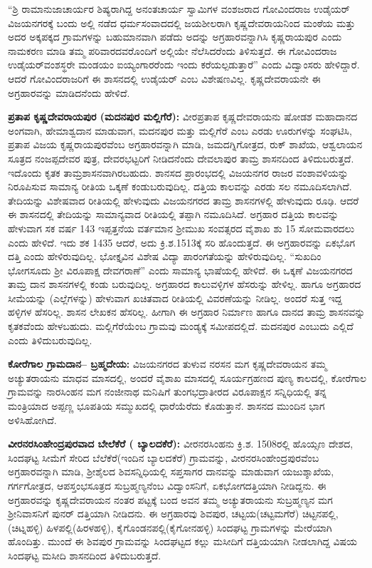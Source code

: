 “ಶ್ರಿ ರಾಮಾನುಜಾಚಾರ್ಯರ ಶಿಷ್ಯರಾಗಿದ್ದ ಅನಂತಚಾರ್ಯ ಸ್ವಾಮಿಗಳ ವಂಶಜರಾದ ಗೋವಿಂದರಾಜ ಉಡೈಯರ್​ ವಿಜಯನಗರಕ್ಕೆ ಬಂದು ಅಲ್ಲಿ ನಡೆದ ಧರ್ಮಸಂವಾದದಲ್ಲಿ ಜಯಶೀಲರಾಗಿ ಕೃಷ್ಣದೇವರಾಯನಿಂದ ಮಂಠೆಯ ಮತ್ತು ಅದರ ಅಕ್ಕಪಕ್ಕದ ಗ್ರಾಮಗಳನ್ನು ಬಹುಮಾನವಾಗಿ ಪಡೆದು ಅದನ್ನು ಅಗ್ರಹಾರವನ್ನಾಗಿಸಿ ಕೃಷ್ಣರಾಯಪುರ ಎಂದು ನಾಮಕರಣ ಮಾಡಿ ತಮ್ಮ ಪರಿವಾರದವರೊಂದಿಗೆ ಅಲ್ಲಿಯೇ ನೆಲೆಸಿದರೆಂದು ತಿಳಿಸುತ್ತದೆ. ಈ ಗೋವಿಂದರಾಜ ಉಡೈಯರ್​ ವಂಶಸ್ಥರೇ ಮಂಡಯಂ ಐಯ್ಯಂಗಾರರೆಂದು ಇಂದು ಕರೆಯಲ್ಪಡುತ್ತಾರೆ” ಎಂದು ವಿದ್ವಾಂಸರು ಹೇಳಿದ್ದಾರೆ. ಆದರೆ ಗೋವಿಂದರಾಜರಿಗೆ ಈ ಶಾಸನದಲ್ಲಿ ಉಡೈಯರ್​ ಎಂಬ ವಿಶೇಷಣವಿಲ್ಲ. ಕೃಷ್ಣದೇವರಾಯನೇ ಈ ಅಗ್ರಹಾರವನ್ನು ಮಾಡಿದನೆಂದು ಹೇಳಿದೆ.

\textbf{ಪ್ರತಾಪ ಕೃಷ್ಣದೇವರಾಯಪುರ (ಮದನಪುರ ಮಲ್ಲಿಗೆರೆ):} ವೀರಪ್ರತಾಪ ಕೃಷ್ಣದೇವರಾಯನು ಷೋಡಶ ಮಹಾದಾನದ ಅಂಗವಾಗಿ, ಹೇಮಾಶ್ವದಾನ ಮಾಡುವಾಗ, ಮದನಪುರ ಮತ್ತು ಮಲ್ಲಿಗೆರೆ ಎಂಬ ಎರಡು ಊರುಗಳನ್ನು ಸಂಘಟಿಸಿ, ಪ್ರತಾಪ ವಿಜಯ ಕೃಷ್ಣರಾಯಪುರವೆಂಬ ಅಗ್ರಹಾರವನ್ನಾಗಿ ಮಾಡಿ, ಜಮದಗ್ನಿಗೋತ್ರದ, ರುಕ್​ ಶಾಖೆಯ, ಆಶ್ವಲಾಯನ ಸೂತ್ರದ ನಂಜಪ್ಪದೇವರ ಪುತ್ರ, ದೇವರಭಟ್ಟರಿಗೆ ನೀಡಿದನೆಂದು ದೇವಲಾಪುರ ತಾಮ್ರ ಶಾಸನದಿಂದ ತಿಳಿದುಬರುತ್ತದೆ. ಇದೊಂದು ಕೃತಕ ತಾಮ್ರಶಾಸನವಾಗಿರಬಹುದು. ಶಾನಸದ ಪ್ರಾರಂಭದಲ್ಲಿ ವಿಜಯನಗರ ರಾಜರ ವಂಶಾವಳಿಯನ್ನು ನಿರೂಪಿಸುವ ಸಾಮಾನ್ಯ ರೀತಿಯ ಒಕ್ಕಣೆ ಕಂಡುಬರುವುದಿಲ್ಲ. ದತ್ತಿಯ ಕಾಲವನ್ನು ಎರಡು ಸಲ ನಮೂದಿಸಲಾಗಿದೆ. ತೇದಿಯನ್ನು ವಿಶೇಷವಾದ ರೀತಿಯಲ್ಲಿ ಹೇಳುವುದು ವಿಜಯನಗರದ ತಾಮ್ರ ಶಾಸನಗಳಲ್ಲಿ ಹೇಳುವುದು ರೂಢಿ. ಆದರೆ ಈ ಶಾಸನದಲ್ಲಿ ತೇದಿಯನ್ನು ಸಾಮಾನ್ಯವಾದ ರೀತಿಯಲ್ಲಿ ತಪ್ಪಾಗಿ ನಮೂದಿಸಿದೆ. ಅಗ್ರಹಾರ ದತ್ತಿಯ ಕಾಲವನ್ನು ಹೇಳುವಾಗ ಸಕ ವರ್ಷ 143 ಇಪ್ಪತ್ತನೆಯ ವರ್ತಮಾನ ಶ‍್ರೀಮುಖ ಸಂವತ್ಸರದ ವೈಶಾಖ ಶು 15 ಸೋಮವಾರದಲು ಎಂದು ಹೇಳಿದೆ. ಇದು ಶಕ 1435 ಆದರೆ, ಅದು ಕ್ರಿ.ಶ.1513ಕ್ಕೆ ಸರಿ ಹೊಂದುತ್ತದೆ. ಈ ಅಗ್ರಹಾರವನ್ನು ಏಕಭೊಗ ದತ್ತಿ ಎಂದು ಹೇಳಿರುವುದಿಲ್ಲ. ಭೋಕ್ತೃವಿನ ವಿಶೇಷ ವಿದ್ಯಾ ಪಾರಂಗತೆಯನ್ನು ಹೇಳಿರುವುದಿಲ್ಲ. “ಸುಖದಿಂ ಭೋಗಸೂದು ಶ‍್ರೀ ವಿರೂಪಾಕ್ಷ ದೇವಗರಾಣೆ” ಎಂದು ಸಾಮಾನ್ಯ ಭಾಷೆಯಲ್ಲಿ ಹೇಳಿದೆ. ಈ ಒಕ್ಕಣೆ ವಿಜಯನಗರದ ತಾಮ್ರ ದಾನ ಶಾಸನಗಳಲ್ಲಿ ಕಂಡು ಬರುವುದಿಲ್ಲ. ಅಗ್ರಹಾರದ ಕಾಲುವಳ್ಳಿಗಳ ಹೆಸರುನ್ನು ಹೇಳಿಲ್ಲ. ಹಾಗೂ ಅಗ್ರಹಾರದ ಸೀಮೆಯನ್ನು (ಎಲ್ಲೆಗಳನ್ನು) ಹೇಳುವಾಗ ಖಚಿತವಾದ ರೀತಿಯಲ್ಲಿ ವಿವರಣೆಯನ್ನು ನೀಡಿಲ್ಲ. ಅಂದರೆ ಸುತ್ತ ಇದ್ದ ಹಳ್ಳಿಗಳ ಹೆಸರಿಲ್ಲ. ಶಾಸನ ಲೇಖಕನ ಹೆಸರಿಲ್ಲ. ಹೀಗಾಗಿ ಈ ಅಗ್ರಹಾರ ನಿರ್ಮಾಣ ಹಾಗೂ ದಾನದ ತಾಮ್ರ ಶಾಸನವನ್ನು ಕೃತಕವೆಂದು ಹೇಳಬಹುದು. ಮಲ್ಲಿಗೆರೆಯೆಂಬ ಗ್ರಾಮವು ಮಂಡ್ಯಕ್ಕೆ ಸಮೀಪದಲ್ಲಿದೆ. ಮದನಪುರ ಎಂಬುದು ಎಲ್ಲಿದೆ ಎಂದು ತಿಳಿದುಬರುವುದಿಲ್ಲ.

\textbf{ಕೋರೆಗಾಲ ಗ್ರಾಮದಾನ– ಬ್ರಹ್ಮದೇಯ:} ವಿಜಯನಗರದ ತುಳುವ ನರಸನ ಮಗ ಕೃಷ್ಣದೇವರಾಯನ ತಮ್ಮ ಅಚ್ಯುತರಾಯನು ಮಾಧವ ಮಾಸದಲ್ಲಿ, ಅಂದರೆ ವೈಶಾಖ ಮಾಸದಲ್ಲಿ ಸೂರ್ಯಗ್ರಹಣದ ಪುಣ್ಯ ಕಾಲದಲ್ಲಿ, ಕೋರೆಗಾಲ ಗ್ರಾಮವನ್ನು ನಾರಸಿಂಹನ ಮಗ ನಂಜೀನಾಥ ಮನಿಷಿಗೆ ತುಂಗಭದ್ರಾತೀರದ ವಿರೂಪಾಕ್ಷನ ಸನ್ನಿಧಿಯಲ್ಲಿ ತನ್ನ ಮಂತ್ರಿಯಾದ ಅಪ್ಪಣ್ಣ ಭೂಪತಿಯ ಸಮ್ಮುಖದಲ್ಲಿ ಧಾರೆಯೆರೆದು ಕೊಡುತ್ತಾನೆ. ಶಾಸನದ ಮುಂದಿನ ಭಾಗ ಅಳಿಸಿಹೋಗಿದೆ.

\textbf{ವೀರನರಸಿಂಹೇಂದ್ರಪುರವಾದ ಬೇಲೆಕೆರೆ ( ಬ್ಯಾಲದಕೆರೆ): } ವೀರನರಸಿಂಹನು ಕ್ರಿ.ಶ. 1508ರಲ್ಲಿ ಹೊಯ್ಸಣ ದೇಶದ, ಸಿಂದಘಟ್ಟ ಸೀಮೆಗೆ ಸೇರಿದ ಬೆಲೆಕೆರೆ(ಇಂದಿನ ಬ್ಯಾಲದಕೆರೆ) ಗ್ರಾಮವನ್ನು, ವೀರನರಸಿಂಹೇಂದ್ರಪುರವೆಂಬ ಅಗ್ರಹಾರವನ್ನಾಗಿ ಮಾಡಿ, ಶ‍್ರೀಶೈಲದ ಶಿವಸನ್ನಿಧಿಯಲ್ಲಿ ಸಪ್ತಸಾಗರ ದಾನವನ್ನು ಮಾಡುವಾಗ ಯಜುಶ್ಶಾಖೆಯ, ಗರ್ಗಗೋತ್ರದ, ಆಪಸ್ತಂಭಸೂತ್ರದ ಸುಬ್ರಹ್ಮಣ್ಯನೆಂಬ ವಿದ್ವಾಂಸನಿಗೆ, ಏಕಭೋಗದತ್ತಿಯಾಗಿ ನೀಡಿದ್ದನು. ಈ ಅಗ್ರಹಾರವನ್ನು ಕೃಷ್ಣದೇವರಾಯನ ನಂತರ ಪಟ್ಟಕ್ಕೆ ಬಂದ ಅವನ ತಮ್ಮ ಅಚ್ಯುತರಾಯನು ಸುಬ್ರಹ್ಮಣ್ಯನ ಮಗ ಶ‍್ರೀನಿವಾಸನಿಗೆ ಪುನರ್​ ದತ್ತಿಯಾಗಿ ನೀಡಿದನು. ಈ ಅಗ್ರಹಾರವು ಶಿವಪುರ, ಚಟ್ಟಯ(ಚಟ್ಟಮಗೆರೆ) ಚಿಟ್ಟನಪಲ್ಲಿ,(ಚಿಟ್ನಹಳ್ಳಿ) ಹಿಳಪಲ್ಲಿ(ಹಿರಳಹಳ್ಳಿ), ಕೈಗೊಂಡನಪಲ್ಲಿ(ಕೈಗೋನಹಳ್ಳಿ) ಸಿಂದಘಟ್ಟ ಗ್ರಾಮಗಳನ್ನು ಮೇರೆಯಾಗಿ ಹೊಂದಿತ್ತು. ಮುಂದೆ ಈ ಶಿವಪುರ ಗ್ರಾಮವನ್ನು ಸಿಂದಘಟ್ಟದ ಕಲ್ಲು ಮಸೀದಿಗೆ ದತ್ತಿಯಯಾಗಿ ನೀಡಲಾಗಿದ್ದ ವಿಷಯ ಸಿಂದಘಟ್ಟ ಮಸೀದಿ ಶಾಸನದಿಂದ ತಿಳಿದುಬರುತ್ತದೆ.

